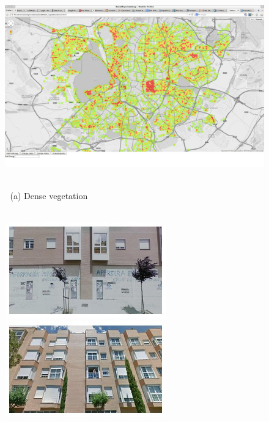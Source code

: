 \begin{figure}
\begin{minipage}{\linewidth}
\begin{minipage}{0.3\linewidth}
    \end{minipage}
    \begin{minipage}{0.7\linewidth}
      \includegraphics[trim= 350 150 250 150, clip=true, width=\linewidth]{imgs/vege/mapT2.jpg}
    \end{minipage}
  \end{minipage}
  \\
  $\;$ \hspace{30mm} (a) Dense vegetation
  \\
  \\
  \begin{minipage}{\linewidth}
    \begin{minipage}{0.3\linewidth}
      \includegraphics[width=0.49\linewidth]{imgs/vege/mosaicsT1/mosaic0012.jpg}
      \includegraphics[width=0.49\linewidth]{imgs/vege/mosaicsT1/mosaic0019.jpg}
      \\ \vspace{-3mm} \\

\end{minipage}
\end{minipage}
\end{figure}
